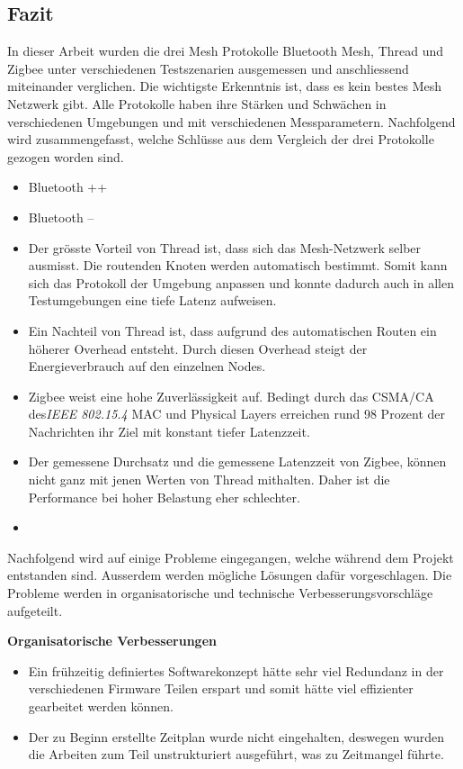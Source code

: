 \newpage
\subsection{Fazit}\label{subsec:Fazit}
In dieser Arbeit wurden die drei Mesh Protokolle Bluetooth Mesh, Thread und Zigbee unter verschiedenen Testszenarien ausgemessen und anschliessend miteinander verglichen.
Die wichtigste Erkenntnis ist, dass es kein bestes Mesh Netzwerk gibt.
Alle Protokolle haben ihre Stärken und Schwächen in verschiedenen Umgebungen und mit verschiedenen Messparametern.
Nachfolgend wird zusammengefasst, welche Schlüsse aus dem Vergleich der drei Protokolle gezogen worden sind.

\begin{itemize}

	\item Bluetooth ++
	\item Bluetooth --
	\item Der grösste Vorteil von Thread ist, dass sich das Mesh-Netzwerk selber ausmisst. Die routenden Knoten werden automatisch bestimmt. Somit kann sich das Protokoll der Umgebung anpassen und konnte dadurch auch in allen Testumgebungen eine tiefe Latenz aufweisen.
	\item Ein Nachteil von Thread ist, dass aufgrund des automatischen Routen ein höherer Overhead entsteht. Durch diesen Overhead steigt der Energieverbrauch auf den einzelnen Nodes.
	\item Zigbee weist eine hohe Zuverlässigkeit auf.
	Bedingt durch das CSMA\slash CA des\linebreak \textit{IEEE 802.15.4} MAC und Physical Layers erreichen rund 98 Prozent der Nachrichten ihr Ziel mit konstant tiefer Latenzzeit.
	\item Der gemessene Durchsatz und die gemessene Latenzzeit von Zigbee, können nicht ganz mit jenen Werten von Thread mithalten.
	Daher ist die Performance bei hoher Belastung eher schlechter.
		\item {}
\end{itemize}

Nachfolgend wird auf einige Probleme eingegangen, welche während dem Projekt entstanden sind. Ausserdem werden mögliche Lösungen dafür vorgeschlagen.
Die Probleme werden in organisatorische und technische Verbesserungsvorschläge aufgeteilt.

\textbf{Organisatorische Verbesserungen}
\begin{itemize}
	\item Ein frühzeitig definiertes Softwarekonzept hätte sehr viel Redundanz in der verschiedenen Firmware Teilen erspart und somit hätte viel effizienter gearbeitet werden können.
	\item Der zu Beginn erstellte Zeitplan wurde nicht eingehalten, deswegen wurden die Arbeiten zum Teil unstrukturiert ausgeführt, was zu Zeitmangel führte. 
\end{itemize}

